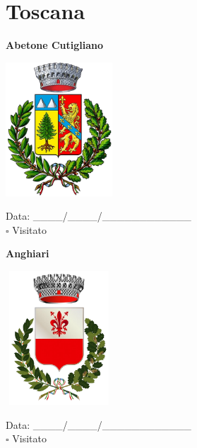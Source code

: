 \documentclass[a5paper,12pt]{article}
\begin{document}
\newpage

\section*{Toscana}

\newpage

\noindent
\begin{minipage}[t]{0.45\textwidth}
    \begin{center}
        \textbf{Abetone Cutigliano}
    \end{center}
    \vspace{-0.5cm} %
    \begin{center}
        \includegraphics[height= 5cm, width=4cm]{Toscana/Stemma Abetone Cutigliano.png}
    \end{center}
    \vspace{-0.4cm} %
    \begin{flushleft}
        Data: \_\_\_\_/\_\_\_\_/\_\_\_\_\_\_\_\_\_\_\_\_ \\
        $\square$ Visitato
    \end{flushleft}
\end{minipage}
\hfill
\noindent
\begin{minipage}[t]{0.45\textwidth}
    \begin{center}
        \textbf{Anghiari}
    \end{center}
    \vspace{-0.5cm} %
    \begin{center}
        \includegraphics[height= 5cm, width=4cm]{Toscana/Stemma Anghiari.png}
    \end{center}
    \vspace{-0.4cm} %
    \begin{flushleft}
        Data: \_\_\_\_/\_\_\_\_/\_\_\_\_\_\_\_\_\_\_\_\_ \\
        $\square$ Visitato
    \end{flushleft}
\end{minipage}
\end{document}
